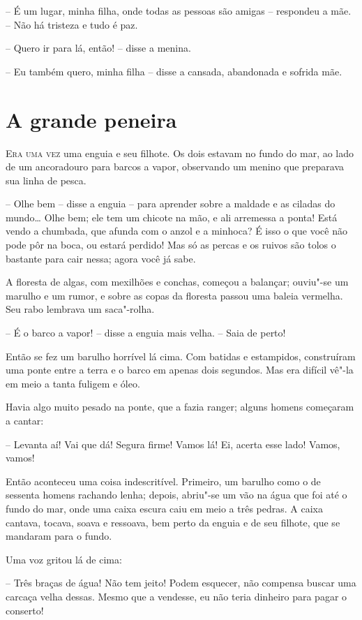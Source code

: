 -- É um lugar, minha filha, onde todas as pessoas são amigas -- respondeu
a mãe. -- Não há tristeza e tudo é paz.

-- Quero ir para lá, então! -- disse a menina.

-- Eu também quero, minha filha  -- disse a cansada, abandonada e sofrida mãe.


\chapter{A grande peneira}

\textsc{Era uma vez} uma enguia e seu filhote. Os dois estavam no fundo do mar,
ao lado de um ancoradouro para barcos a vapor, observando um menino que
preparava sua linha de pesca.

-- Olhe bem -- disse a enguia -- para aprender sobre a maldade e as
ciladas do mundo\ldots{} Olhe bem; ele tem um chicote na mão, e ali
arremessa a ponta! Está vendo a chumbada, que afunda com o anzol e a
minhoca? É isso o que você não pode pôr na boca, ou estará perdido! Mas
só as percas e os ruivos são tolos o bastante para cair nessa; agora
você já sabe.

A floresta de algas, com mexilhões e conchas, começou a balançar;
ouviu"-se um marulho e um rumor, e sobre as copas da floresta passou
uma baleia vermelha. Seu rabo lembrava um saca"-rolha.

-- É o barco a vapor! -- disse a enguia mais velha. -- Saia de perto!

Então se fez um barulho horrível lá cima. Com batidas e estampidos,
construíram uma ponte entre a terra e o barco em apenas dois segundos.
Mas era difícil vê"-la em meio a tanta fuligem e óleo. 

Havia algo muito pesado na ponte, que a fazia ranger; alguns homens
começaram a cantar:

-- Levanta aí! Vai que dá! Segura firme! Vamos lá! Ei,
acerta esse lado! Vamos, vamos!

Então aconteceu uma coisa indescritível. Primeiro, um barulho como o de
sessenta homens rachando lenha; depois, abriu"-se um vão na água que
foi até o fundo do mar, onde uma caixa escura caiu em meio a três
pedras. A caixa cantava, tocava, soava e ressoava, bem perto da enguia
e de seu filhote, que se mandaram para o fundo. 

Uma voz gritou lá de cima:

-- Três braças de água! Não tem jeito! Podem esquecer, não compensa
buscar uma carcaça velha dessas. Mesmo que a vendesse, eu não teria
dinheiro para pagar o conserto!

